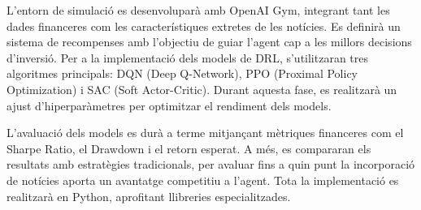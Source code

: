 \documentclass[12pt,a4paper,twoside]{book}
\begin{document}
L’entorn de simulació es desenvoluparà amb OpenAI Gym, integrant tant les dades financeres com les característiques extretes de les notícies. Es definirà un sistema de recompenses amb l’objectiu de guiar l’agent cap a les millors decisions d'inversió. Per a la implementació dels models de DRL, s’utilitzaran tres algoritmes principals: DQN (Deep Q-Network), PPO (Proximal Policy Optimization) i SAC (Soft Actor-Critic). Durant aquesta fase, es realitzarà un ajust d’hiperparàmetres per optimitzar el rendiment dels models.

L’avaluació dels models es durà a terme mitjançant mètriques financeres com el Sharpe Ratio, el Drawdown i el retorn esperat. A més, es compararan els resultats amb estratègies tradicionals, per avaluar fins a quin punt la incorporació de notícies aporta un avantatge competitiu a l’agent. Tota la implementació es realitzarà en Python\cite{Python}, aprofitant llibreries especialitzades.
\end{document}
